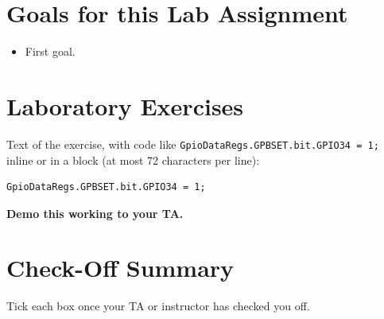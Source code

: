 \documentclass[11pt]{article}
\begin{document}
\MakeAssignmentTitle

\section*{Goals for this Lab Assignment}
%
\begin{itemize}
    \item First goal.
\end{itemize}
%
\section*{Laboratory Exercises}


Text of the exercise, with code like \texttt{GpioDataRegs.GPBSET.bit.GPIO34 = 1;} inline or in a block
(at most 72 characters per line):
%
\begin{verbatim}
GpioDataRegs.GPBSET.bit.GPIO34 = 1;
\end{verbatim}
%
\begin{checkoff}
        \textbf{Demo this working to your TA.}
\end{checkoff}
%
\section*{Check-Off Summary}

Tick each box once your TA or instructor has checked you off.
%
\CheckOffSummary

\MakeFooter
\end{document}

